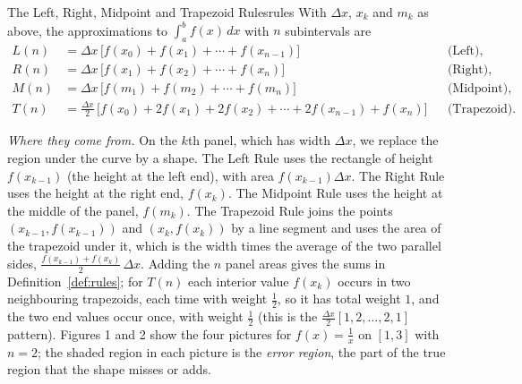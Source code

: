 \documentclass[11pt]{article}
\begin{document}
\begin{defn}{The Left, Right, Midpoint and Trapezoid Rules}{rules}
With $\Delta x$, $x_k$ and $m_k$ as above, the approximations to $\int_a^bf(x)\,dx$ with $n$ subintervals are
\begin{align*}
L(n)&=\Delta x\,\big[f(x_0)+f(x_1)+\cdots+f(x_{n-1})\big]&&\text{(Left),}\\
R(n)&=\Delta x\,\big[f(x_1)+f(x_2)+\cdots+f(x_n)\big]&&\text{(Right),}\\
M(n)&=\Delta x\,\big[f(m_1)+f(m_2)+\cdots+f(m_n)\big]&&\text{(Midpoint),}\\
T(n)&=\frac{\Delta x}2\,\big[f(x_0)+2f(x_1)+2f(x_2)+\cdots+2f(x_{n-1})+f(x_n)\big]&&\text{(Trapezoid).}
\end{align*}
\end{defn}

\emph{Where they come from.} On the $k$th panel, which has width $\Delta x$, we replace the region under the curve by a shape. The Left Rule uses the rectangle of height $f(x_{k-1})$ (the height at the left end), with area $f(x_{k-1})\Delta x$. The Right Rule uses the height at the right end, $f(x_k)$. The Midpoint Rule uses the height at the middle of the panel, $f(m_k)$. The Trapezoid Rule joins the points $(x_{k-1},f(x_{k-1}))$ and $(x_k,f(x_k))$ by a line segment and uses the area of the trapezoid under it, which is the width times the average of the two parallel sides, $\frac{f(x_{k-1})+f(x_k)}2\,\Delta x$. Adding the $n$ panel areas gives the sums in Definition~\ref{def:rules}; for $T(n)$ each interior value $f(x_k)$ occurs in two neighbouring trapezoids, each time with weight $\frac12$, so it has total weight $1$, and the two end values occur once, with weight $\frac12$ (this is the $\frac{\Delta x}2[1,2,\ldots,2,1]$ pattern). Figures 1 and 2 show the four pictures for $f(x)=\frac1x$ on $[1,3]$ with $n=2$; the shaded region in each picture is the \emph{error region}, the part of the true region that the shape misses or adds.
\end{document}
